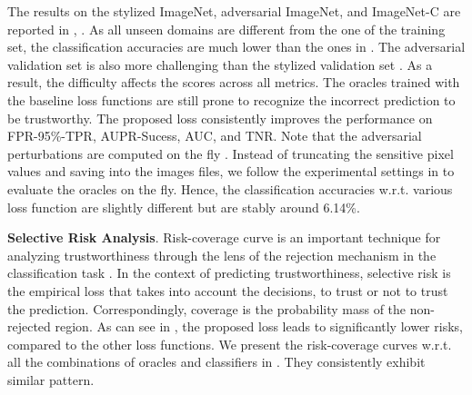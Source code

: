 The results on the stylized ImageNet, adversarial ImageNet, and ImageNet-C are reported in , .
As all unseen domains are different from the one of the training set, the classification accuracies are much lower than the ones in . 
The adversarial validation set is also more challenging than the stylized validation set .
As a result, the difficulty affects the scores across all metrics.
The oracles trained with the baseline loss functions are still prone to recognize the incorrect prediction to be trustworthy.
The proposed loss consistently improves the performance on FPR-95\%-TPR, AUPR-Sucess, AUC, and TNR.
Note that the adversarial perturbations are computed on the fly \cite{Laidlaw_NeurIPS_2019}. Instead of truncating the sensitive pixel values and saving into the images files, we follow the experimental settings in \cite{Laidlaw_NeurIPS_2019} to evaluate the oracles on the fly.
Hence, the classification accuracies w.r.t. various loss function are slightly different but are stably around 6.14\%.






\noindent\textbf{Selective Risk Analysis}.
Risk-coverage curve is an important technique for analyzing trustworthiness through the lens of the rejection mechanism in the classification task \cite{Corbiere_NIPS_2019,Geifman_NIPS_2017}. 
In the context of predicting trustworthiness, selective risk is the empirical loss that takes into account the decisions, \ie to trust or not to trust the prediction. 
Correspondingly, coverage is the probability mass of the non-rejected region. As can see in , the proposed loss leads to significantly lower risks, compared to the other loss functions.
We present the risk-coverage curves w.r.t. all the combinations of oracles and classifiers in .
They consistently exhibit similar pattern.

